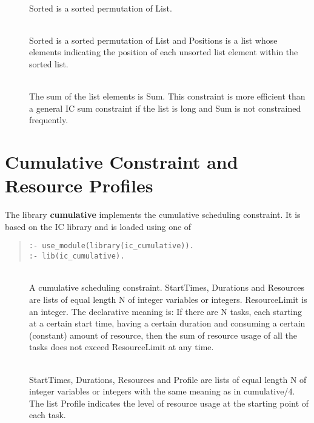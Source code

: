 \begin{description}
\item[]\ \\
Sorted is a sorted permutation of List.

\item[]\ \\
Sorted is a sorted permutation of List and Positions is a list whose
elements indicating the position of each unsorted list element within
the sorted list.

\item[]\ \\
The sum of the list elements is Sum. This constraint
is more efficient than a general IC sum constraint
if the list is long and Sum is not constrained frequently.

\end{description}


\section{Cumulative Constraint and Resource Profiles}

The library {\bf cumulative} implements the cumulative scheduling constraint.
It is based on the IC library and is loaded using one of 
\begin{quote}\begin{verbatim}
:- use_module(library(ic_cumulative)).
:- lib(ic_cumulative).
\end{verbatim}\end{quote}


\begin{description}
\item[]\ \\
A cumulative scheduling constraint. StartTimes, Durations and Resources
are lists of equal length N of integer variables or integers.
ResourceLimit is an integer. The declarative meaning is:
If there are N tasks, each starting at a certain start time, having
a certain duration and consuming a certain (constant) amount of
resource, then the sum of resource usage of all the tasks does not
exceed ResourceLimit at any time.

\item[]\ \\
StartTimes, Durations, Resources and Profile
are lists of equal length N of integer variables or integers
with the same meaning as in cumulative/4.
The list Profile indicates the level of resource usage at the
starting point of each task.
\end{description}


